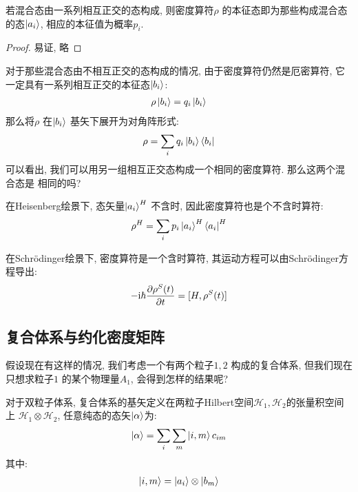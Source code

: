 \begin{theorem}
  若混合态由一系列相互正交的态构成, 则密度算符$\rho$ 的本征态即为那些构成混合态的态$\ket{a_{i}}$,
  相应的本征值为概率$p_{i}$.
\end{theorem}
\begin{proof}
  易证, 略
\end{proof}
\begin{remark}
  对于那些混合态由不相互正交的态构成的情况, 由于密度算符仍然是厄密算符, 它一定具有一系列相互正交的本征态$\ket{b_{i}}$:
  \begin{equation}
    \begin{aligned}
      \rho \ket{b_{i}} = q_{i} \ket{b_{i}}
    \end{aligned}
  \end{equation}
  那么将$\rho$ 在$\ket{b_{i}}$ 基矢下展开为对角阵形式:
  \begin{equation}
    \begin{aligned}
      \rho = \sum_{i} q_{i} \ket{b_{i}}\bra{b_{i}}
    \end{aligned}
  \end{equation}
  可以看出, 我们可以用另一组相互正交态构成一个相同的密度算符. 那么这两个混合态是
  相同的吗?
\end{remark}


在Heisenberg绘景下, 态矢量$\ket{a_{i}}^{H}$ 不含时, 因此密度算符也是个不含时算符:
\begin{equation}
  \begin{aligned}
    \rho^{H} = \sum_{i} p_{i} \ket{a_{i}}^{H}\bra{a_{i}}^{H}
  \end{aligned}
\end{equation}

在Schr\"odinger绘景下, 密度算符是一个含时算符, 其运动方程可以由Schr\"odinger方程导出:
\begin{equation}\label{eq:density_op_Liouville_eq}
  \begin{aligned}
    - {\rm i} \hbar \pdv{\rho^{S}(t)}{t} = [H, \rho^{S}(t)]
  \end{aligned}
\end{equation}

\subsection{复合体系与约化密度矩阵}
假设现在有这样的情况, 我们考虑一个有两个粒子$1,2$ 构成的复合体系, 但我们现在
只想求粒子$1$ 的某个物理量$A_1$, 会得到怎样的结果呢?

对于双粒子体系, 复合体系的基矢定义在两粒子Hilbert空间$\mathcal{H}_{1}, \mathcal{H}_{2}$的张量积空间上
$\mathcal{H}_{1}\otimes \mathcal{H}_{2}$, 任意纯态的态矢$\ket{\alpha}$为:
\begin{equation}
  \begin{aligned}
    \ket{\alpha} = \sum_{i} \sum_{m} \ket{i,m} c_{im}
  \end{aligned}
\end{equation}
其中:
\begin{equation}
  \begin{aligned}
    \ket{i,m} = \ket{a_{i}}\otimes \ket{b_{m}}
  \end{aligned}
\end{equation}

